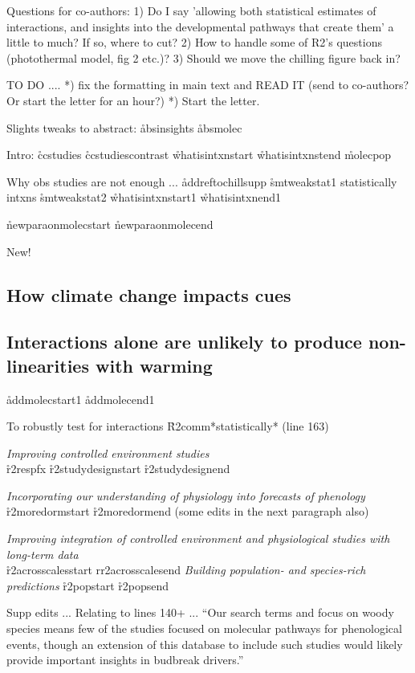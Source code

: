\documentclass[11pt,letter]{article}
\begin{document}
 


Questions for co-authors:
1) Do I say 'allowing both statistical estimates of interactions, and insights into the developmental pathways that create them' a little to much? If so, where to cut?
2) How to handle some of R2's questions (photothermal model, fig 2 etc.)?
3) Should we move the chilling figure back in?

TO DO ....
*) fix the formatting in main text and READ IT (send to co-authors? Or start the letter for an hour?)
*) Start the letter.


Slights tweaks to abstract: 
\r{absinsights}
\r{absmolec} 

Intro:
\r{ccstudies} 
\r{ccstudiescontrast} 
\r{whatisintxnstart}
\r{whatisintxnstend}
\r{molecpop}

Why obs studies are not enough ...
\r{addreftochillsupp}
\r{smtweakstat1} statistically intxns
\r{smtweakstat2}
\r{whatisintxnstart1}
\r{whatisintxnend1}

\r{newparaonmolecstart}
\r{newparaonmolecend}

New! \subsection{How climate change impacts cues}

\subsection{Interactions alone are unlikely to produce non-linearities with warming}
\r{addmolecstart1}
\r{addmolecend1}

To robustly test for interactions \r{R2comm}*statistically* (line 163)

\emph{Improving controlled environment studies}\\

\r{r2respfx}
\r{r2studydesignstart}
\r{r2studydesignend}

\emph{Incorporating our understanding of physiology into forecasts of phenology}\\
\r{r2moredormstart}
\r{r2moredormend} (some edits in the next paragraph also)


\emph{Improving integration of controlled environment and physiological studies with long-term data}\\
\r{r2acrosscalesstart}
r{r2acrosscalesend}
\emph{Building population- and species-rich predictions} %
\r{r2popstart}
\r{r2popsend}

Supp edits ... 
Relating to lines 140+ ... ``Our search terms and focus on woody species means few of the studies focused on molecular pathways for phenological events, though an extension of this database to include such studies would likely provide important insights in budbreak drivers.''
\end{document}
